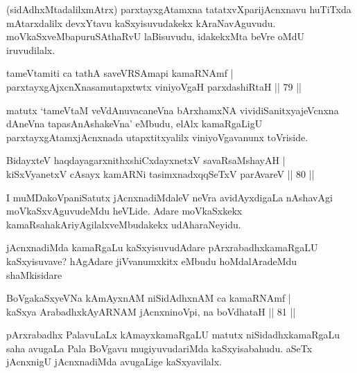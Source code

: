 \begin{artha}
(sidAdhxMtadalilxmAtrx) parxtayxgAtamxna tatatxvXparijAcnxnavu huTiTxda mAtarxdalilx devxYtavu kaSxyisuvudakekx kAraNavAguvudu. moVkaSxveMba\break puruSAthaRvU laBisuvudu, idakekxMta beVre oMdU iruvudilalx.
\end{artha}

\begin{shl}
tameVtamiti ca tathA saveVRSAmapi kamaRNAmf |\\
parxtayxgAjxcnXnasamutapxtwtx viniyoVgaH parxdashiRtaH \hfill || 79 ||
\end{shl}

\begin{artha}
matutx `tameVtaM veVdAnuvacaneVna bArxhamxNA vividiSanitx\break yajeVcnxna dAneVna tapasA\s nAshakeVna' eMbudu, elAlx kamaRgaLigU parxtayxgAtamxjAcnxnada utapxtitxyalilx viniyoVgavanunx toVriside.
\end{artha}

\begin{shl}
BidayxteV haqdayagarxnithxshiCxdayxnetxV savaRsaMshayAH |\\
kiSxVyanetxV cAsayx kamARNi tasimxnadxqqSeTxV parAvareV \hfill || 80 ||
\end{shl}

\begin{artha}
I muMDakoVpaniSatutx jAcnxnadiMdaleV neVra avidAyxdigaLa nAshavAgi moVkaSxvAguvudeMdu heVLide. Adare moVkaSxkekx kamaRsahakAriyAgilalxveMbudakekx udAharaNeyidu.
\end{artha}

\begin{artha}
jAcnxnadiMda kamaRgaLu kaSxyisuvudAdare pArxrabadhxkamaRgaLU kaSxyisuvave? hAgAdare jiVvanumxkitx eMbudu hoMdalAradeMdu shaMkisidare
\end{artha}


\begin{shl}
BoVgakaSxyeVNa kAmAyxnAM niSidAdhxnAM ca kamaRNAmf |\\
kaSxya ArabadhxkAyARNAM jAcnxninoV\s pi, na boVdhataH \hfill || 81 ||
\end{shl}

\begin{artha}
pArxrabadhx PalavuLaLx kAmayxkamaRgaLU matutx niSidadhxkamaRgaLu saha avugaLa Pala BoVgavu mugiyuvudariMda kaSxyisabahudu. aSeTx jAcnxnigU jAcnxnadiMda avugaLige kaSxyavilalx.
\end{artha}


